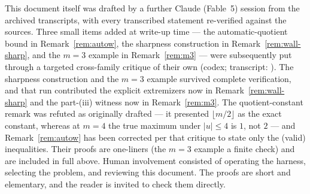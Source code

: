 \documentclass[11pt]{article}
\theoremstyle{definition}
\theoremstyle{remark}
\begin{document}
This document itself was drafted by a further Claude (Fable~5) session
from the archived transcripts, with every transcribed statement
re-verified against the sources. Three small items added at write-up
time --- the automatic-quotient bound in Remark~\ref{rem:autow}, the
sharpness construction in Remark~\ref{rem:wall-sharp}, and the $m=3$
example in Remark~\ref{rem:m3} --- were subsequently put through a
targeted cross-family critique of their own (codex; transcript:
).
The sharpness construction and the $m=3$ example survived complete
verification, and that run contributed the explicit extremizers now in
Remark~\ref{rem:wall-sharp} and the part-(iii) witness now in
Remark~\ref{rem:m3}. The quotient-constant remark was refuted as
originally drafted --- it presented $\lfloor m/2\rfloor$ as the exact
constant, whereas at $m=4$ the true maximum under $|u|\le4$ is $1$, not
$2$ --- and Remark~\ref{rem:autow} has been corrected per that critique
to state only the (valid) inequalities. Their proofs are one-liners (the $m=3$
example a finite check) and are included in full above. Human
involvement consisted of operating the harness,
selecting the problem, and reviewing this document. The proofs are short
and elementary, and the reader is invited to check them directly.
\end{document}
